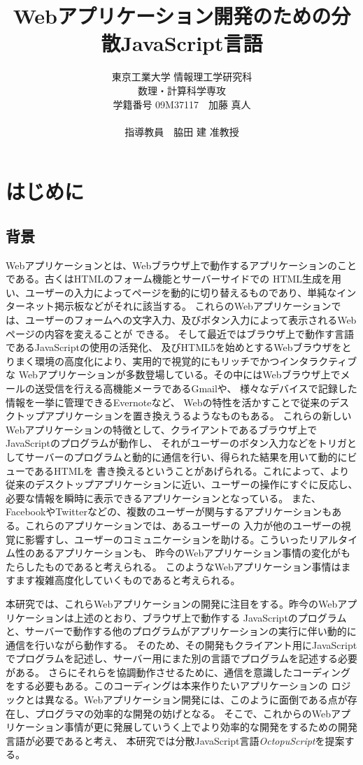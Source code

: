 \documentclass[a4j,12pt]{jreport}
\title {Webアプリケーション開発のための分散JavaScript言語}
\author{東京工業大学 情報理工学研究科 \\数理・計算科学専攻 \\学籍番号 09M37117　加藤 真人\\\\指導教員　脇田 建 准教授}
\begin{document}
\maketitle
\tableofcontents
\listoffigures


\chapter{はじめに}
\section{背景}
Webアプリケーションとは、Webブラウザ上で動作するアプリケーションのことである。古くはHTMLのフォーム機能とサーバーサイドでの
HTML生成を用い、ユーザーの入力によってページを動的に切り替えるものであり、単純なインターネット掲示板などがそれに該当する。
これらのWebアプリケーションでは、ユーザーのフォームへの文字入力、及びボタン入力によって表示されるWebページの内容を変えることが
できる。
そして最近ではブラウザ上で動作す言語であるJavaScriptの使用の活発化、
及びHTML5を始めとするWebブラウザをとりまく環境の高度化により、実用的で視覚的にもリッチでかつインタラクティブな
Webアプリケーションが多数登場している。その中にはWebブラウザ上でメールの送受信を行える高機能メーラであるGmailや、
様々なデバイスで記録した情報を一挙に管理できるEvernoteなど、
Webの特性を活かすことで従来のデスクトップアプリケーションを置き換えうるようなものもある。
これらの新しいWebアプリケーションの特徴として、クライアントであるブラウザ上でJavaScriptのプログラムが動作し、
それがユーザーのボタン入力などをトリガとしてサーバーのプログラムと動的に通信を行い、得られた結果を用いて動的にビューであるHTMLを
書き換えるということがあげられる。これによって、より従来のデスクトップアプリケーションに近い、ユーザーの操作にすぐに反応し、
必要な情報を瞬時に表示できるアプリケーションとなっている。
また、FacebookやTwitterなどの、複数のユーザーが関与するアプリケーションもある。これらのアプリケーションでは、あるユーザーの
入力が他のユーザーの視覚に影響すし、ユーザーのコミュニケーションを助ける。こういったリアルタイム性のあるアプリケーションも、
昨今のWebアプリケーション事情の変化がもたらしたものであると考えられる。
このようなWebアプリケーション事情はますます複雑高度化していくものであると考えられる。

本研究では、これらWebアプリケーションの開発に注目をする。昨今のWebアプリケーションは上述のとおり、ブラウザ上で動作する
JavaScriptのプログラムと、サーバーで動作する他のプログラムがアプリケーションの実行に伴い動的に通信を行いながら動作する。
そのため、その開発もクライアント用にJavaScriptでプログラムを記述し、サーバー用にまた別の言語でプログラムを記述する必要がある。
さらにそれらを協調動作させるために、通信を意識したコーディングをする必要もある。このコーディングは本来作りたいアプリケーションの
ロジックとは異なる。Webアプリケーション開発には、このように面倒である点が存在し、プログラマの効率的な開発の妨げとなる。
そこで、これからのWebアプリケーション事情が更に発展していうく上でより効率的な開発をするための開発言語が必要であると考え、
本研究では分散JavaScript言語{\em OctopuScript}を提案する。
\end{document}
